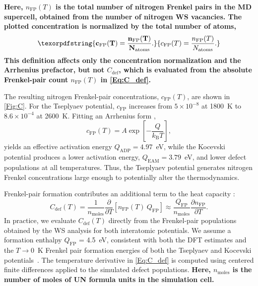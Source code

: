 \documentclass[preprint,12pt,sort&compress]{elsarticle}
\newcommand{\?}{\stackrel{?}{=}}
\providecommand{\DIFaddtex}[1]{{\bf #1}} %
\providecommand{\DIFdeltex}[1]{} %
\providecommand{\DIFaddbegin}{\protect\color{blue}} %
\providecommand{\DIFaddend}{\protect\color{black}} %
\providecommand{\DIFdelbegin}{\protect\color{red}} %
\providecommand{\DIFdelend}{\protect\color{black}} %
\providecommand{\DIFadd}[1]{\texorpdfstring{\DIFaddtex{#1}}{#1}} %
\providecommand{\DIFdel}[1]{\texorpdfstring{\DIFdeltex{#1}}{}} %
\newcommand{\DIFscaledelfig}{0.5}
\newlength{\DIFdelgraphicswidth} %
\newlength{\DIFdelgraphicsheight} %
\newcommand{\DIFaddincludegraphics}[2][]{{\color{blue}\fbox{\DIFOincludegraphics[#1]{#2}}}} %
\newcommand{\DIFdelincludegraphics}[2][]{%
\sbox{\DIFdelgraphicsbox}{\DIFOincludegraphics[#1]{#2}}%
\settoboxwidth{\DIFdelgraphicswidth}{\DIFdelgraphicsbox} %
\settoboxtotalheight{\DIFdelgraphicsheight}{\DIFdelgraphicsbox} %
\scalebox{\DIFscaledelfig}{%
\parbox[b]{\DIFdelgraphicswidth}{\usebox{\DIFdelgraphicsbox}\\[-\baselineskip] \rule{\DIFdelgraphicswidth}{0em}}\llap{\resizebox{\DIFdelgraphicswidth}{\DIFdelgraphicsheight}{%
\setlength{\unitlength}{\DIFdelgraphicswidth}%
\begin{picture}(1,1)%
\thicklines\linethickness{2pt} %
{\color[rgb]{1,0,0}\put(0,0){\framebox(1,1){}}}%
{\color[rgb]{1,0,0}\put(0,0){\line( 1,1){1}}}%
{\color[rgb]{1,0,0}\put(0,1){\line(1,-1){1}}}%
\end{picture}%
}\hspace*{3pt}}} %
} %
\DeclareRobustCommand{\DIFaddbegin}{\DIFOaddbegin \let\includegraphics\DIFaddincludegraphics} %
\DeclareRobustCommand{\DIFaddend}{\DIFOaddend \let\includegraphics\DIFOincludegraphics} %
\DeclareRobustCommand{\DIFdelbegin}{\DIFOdelbegin \let\includegraphics\DIFdelincludegraphics} %
\DeclareRobustCommand{\DIFdelend}{\DIFOaddend \let\includegraphics\DIFOincludegraphics} %
\begin{document}
\DIFaddbegin \DIFadd{Here, $n_{\mathrm{FP}}(T)$ is the total number of nitrogen Frenkel pairs in the MD supercell, obtained from the number of nitrogen WS vacancies. The plotted concentration is normalized by the total number of atoms,
}\begin{equation}
\DIFadd{c_{\mathrm{FP}}(T)=\frac{n_{\mathrm{FP}}(T)}{N_{\mathrm{atoms}}}.
}\end{equation}
\DIFadd{This definition affects only the concentration normalization and the Arrhenius prefactor, but not $C_{\mathrm{def}}$, which is evaluated from the absolute Frenkel-pair count $n_{\mathrm{FP}}(T)$ in \cref{Eq:C_def}.
}

\DIFaddend The resulting nitrogen Frenkel-pair concentrations, $c_{\mathrm{FP}}(T)$, are shown in \cref{Fig:C}. For the Tseplyaev potential, $c_{\mathrm{FP}}$ increases from $5\times10^{-8}$ at 1800~K to $8.6\times10^{-4}$ at 2600~K. Fitting an Arrhenius form \DIFaddbegin \DIFadd{\cite{Olander2017}}\DIFaddend ,
\begin{equation}
c_{\mathrm{FP}}(T) = A \exp\!\left[-\frac{Q}{k_{\mathrm{B}}T}\right],
\end{equation}
yields an effective activation energy $Q_{\mathrm{ADP}} = 4.97$~eV, while the Kocevski potential produces a lower activation energy, $Q_{\mathrm{EAM}} = 3.79$~eV, and lower defect populations at all temperatures. Thus, the Tseplyaev potential generates nitrogen Frenkel concentrations large enough to potentially alter the thermodynamics.


Frenkel-pair formation contributes an additional term to the heat capacity \cite{Szwarc1969,Pavlov2017}:
\begin{equation}
C_{\mathrm{def}}(T) = \frac{1}{n_{\mathrm{moles}}} \frac{\partial}{\partial T} \left[n_{\mathrm{FP}}(T) \ Q_\text{FP} \right]
\approx \frac{Q_\text{FP}}{n_{\mathrm{moles}}} \frac{\partial n_{\mathrm{FP}}}{\partial T}.
\label{Eq:C_def}
\end{equation}
In practice, we evaluate $C_{\mathrm{def}}(T)$ directly from the Frenkel-pair populations obtained by the WS analysis for both interatomic potentials. We assume a formation enthalpy \DIFdelbegin \DIFdel{$Q$ }\DIFdelend \DIFaddbegin \DIFadd{$Q_\text{FP}$ }\DIFaddend = 4.5~eV, consistent with both the DFT estimates \cite{Yang2021,Kocevski2022I} and the $T \rightarrow 0$~K Frenkel pair formation energies of both the Tseplyaev and Kocevski potentials~\cite{AbdulHameed2024}. The temperature derivative in \cref{Eq:C_def} is computed using centered finite differences applied to the simulated defect populations. \DIFaddbegin \DIFadd{Here, $n_{\mathrm{moles}}$ is the number of moles of UN formula units in the simulation cell.
}\DIFaddend 
\end{document}
